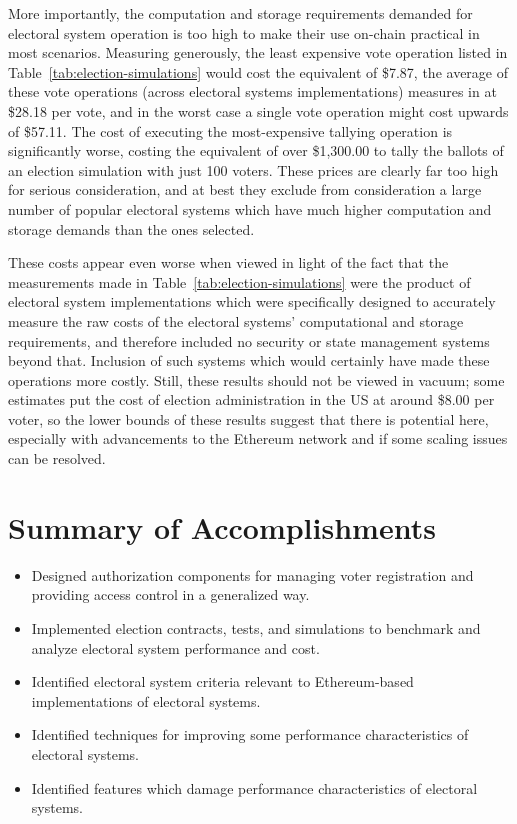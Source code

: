 More importantly, the computation and storage requirements demanded for
electoral system operation is too high to make their use on-chain practical in
most scenarios. Measuring generously, the least expensive vote operation listed
in Table~\ref{tab:election-simulations} would cost the equivalent of \$7.87, the
average of these vote operations (across electoral systems implementations)
measures in at \$28.18 per vote, and in the worst case a single vote operation
might cost upwards of \$57.11. The cost of executing the most-expensive tallying
operation is significantly worse, costing the equivalent of over \$1,300.00 to
tally the ballots of an election simulation with just 100 voters.\footnotemark{}
These prices are clearly far too high for serious consideration, and at best
they exclude from consideration a large number of popular electoral systems
which have much higher computation and storage demands than the ones selected.


These costs appear even worse when viewed in light of the fact that the
measurements made in Table~\ref{tab:election-simulations} were the product of
electoral system implementations which were specifically designed to accurately
measure the raw costs of the electoral systems' computational and storage
requirements, and therefore included no security or state management systems
beyond that. Inclusion of such systems which would certainly have made these
operations more costly. Still, these results should not be viewed in vacuum;
some estimates put the cost of election administration in the US at around
\$8.00 per voter, so the lower bounds of these results suggest that there is
potential here, especially with advancements to the Ethereum network and if some
scaling issues can be resolved.

\section*{Summary of Accomplishments}

\begin{itemize}
  \item Designed authorization components for managing voter registration and
    providing access control in a generalized way.

  \item Implemented election contracts, tests, and simulations to benchmark and
    analyze electoral system performance and cost.

  \item Identified electoral system criteria relevant to Ethereum-based
    implementations of electoral systems.

  \item Identified techniques for improving some performance characteristics
    of electoral systems.

  \item Identified features which damage performance characteristics of
    electoral systems.
\end{itemize}

